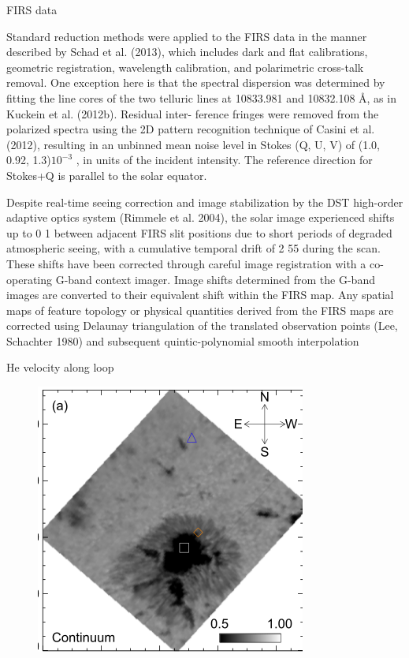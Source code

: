\documentclass{beamer}
\begin{document}
\begin{frame}{FIRS data}

Standard reduction methods were applied to the FIRS data in
the manner described by Schad et al. (2013), which includes
dark and flat calibrations, geometric registration, wavelength
calibration, and polarimetric cross-talk removal. One exception
here is that the spectral dispersion was determined by fitting the
line cores of the two telluric lines at 10833.981 and
10832.108 \AA , as in Kuckein et al. (2012b). Residual inter-
ference fringes were removed from the polarized spectra using
the 2D pattern recognition technique of Casini et al. (2012),
resulting in an unbinned mean noise level in Stokes (Q, U, V)
of (1.0, 0.92, 1.3)$10^{-3}$ , in units of the incident intensity.
The reference direction for Stokes+Q is parallel to the solar
equator.

Despite real-time seeing correction and image stabilization
by the DST high-order adaptive optics system (Rimmele
et al. 2004), the solar image experienced shifts up to 0 1
between adjacent FIRS slit positions due to short periods of
degraded atmospheric seeing, with a cumulative temporal drift
of 2 55 during the scan. These shifts have been corrected
through careful image registration with a co-operating G-band
context imager. Image shifts determined from the G-band
images are converted to their equivalent shift within the FIRS
map. Any spatial maps of feature topology or physical
quantities derived from the FIRS maps are corrected using
Delaunay triangulation of the translated observation points
(Lee, Schachter 1980) and subsequent quintic-polynomial
smooth interpolation

\end{frame}






\begin{frame}{He velocity along loop}

 
\begin{figure}[H]
 \centering
 \includegraphics[scale=0.6]{sp_cont.png}
\end{figure}



\end{frame}
\end{document}
